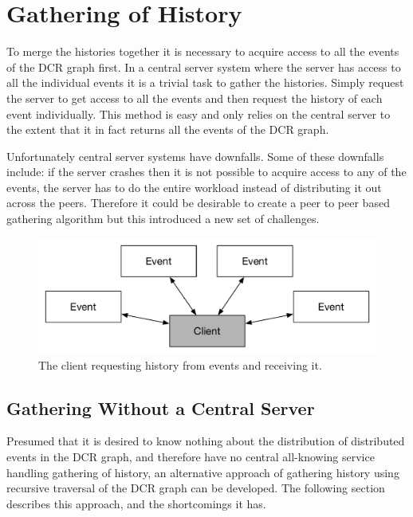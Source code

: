     \section{Gathering of History}
   
    To merge the histories together it is necessary to acquire access to all the events of the DCR graph first. In a central server system where the server has access to all the individual events it is a trivial task to gather the histories. Simply request the server to get access to all the events and then request the history of each event individually. This method is easy and only relies on the central server to the extent that it in fact returns all the events of the DCR graph. 
    
    Unfortunately central server systems have downfalls. Some of these downfalls include: if the server crashes then it is not possible to acquire access to any of the events, the server has to do the entire workload instead of distributing it out across the peers. Therefore it could be desirable to create a peer to peer based gathering algorithm but this introduced a new set of challenges.
    
    \begin{figure}[H]
		\centering
		\includegraphics[height=\textheight/6]{4connect/images/server-contacts-events.pdf}
		\caption{The client requesting history from events and receiving it.}
		\label{fig:connecting:server-contacts-events}
	\end{figure}
    
    \subsection{Gathering Without a Central Server}
	Presumed that it is desired to know nothing about the distribution of distributed events in the DCR graph, and therefore have no central all-knowing service handling gathering of history, an alternative approach of gathering history using recursive traversal of the DCR graph can be developed. The following section describes this approach, and the shortcomings it has.   
	
